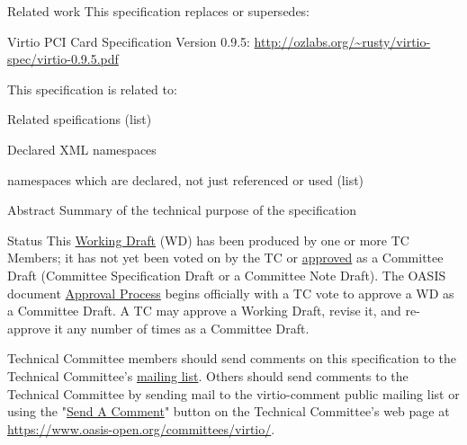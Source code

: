 \begin{titlepage}
\begin{oasistitlesection}{Related work}
This specification replaces or supersedes:
\begin{itemize*}
	\item Virtio PCI Card Specification Version 0.9.5:\newline
	\url{http://ozlabs.org/~rusty/virtio-spec/virtio-0.9.5.pdf}
\end{itemize*}
This specification is related to:
\begin{itemize*}
	\item Related speifications (list)
\end{itemize*}
\end{oasistitlesection}
\vspace{-0.2in}

\begin{oasistitlesection}{Declared XML namespaces}
\vspace{-0.1in}
\begin{itemize*}
	\item namespaces which are declared, not just referenced or used (list)
\end{itemize*}
\end{oasistitlesection}

\begin{oasistitlesection}{Abstract}
Summary of the technical purpose of the specification
\end{oasistitlesection}

\begin{oasistitlesection}{Status}
This \href{https://www.oasis-open.org/committees/process.php#dWorkingDraft}{Working Draft} (WD) has been produced by one or more TC Members; it has not yet been voted on by the TC or \href{https://www.oasis-open.org/committees/process.php#committeeDraft}{approved} as a Committee Draft (Committee Specification Draft or a Committee Note Draft). The OASIS document \href{https://www.oasis-open.org/committees/process.php#standApprovProcess}{Approval Process} begins officially with a TC vote to approve a WD as a Committee Draft. A TC may approve a Working Draft, revise it, and re-approve it any number of times as a Committee Draft.

Technical Committee members should send comments on this specification to the Technical Committee’s \href{https://www.oasis-open.org/committees/tc_home.php?wg_abbrev=virtio#feedback}{mailing list}. Others should send comments to the Technical Committee by sending mail to the virtio-comment public mailing list or using the "\href{https://www.oasis-open.org/committees/comments/form.php?wg_abbrev=virtio}{Send A Comment}" button on the Technical Committee’s web page at \url{https://www.oasis-open.org/committees/virtio/}.
\end{oasistitlesection}



\end{titlepage}
